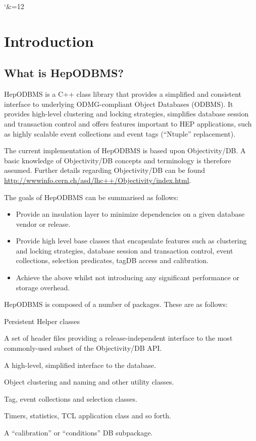 
\catcode`\&=12
\chapter{Introduction\label{H1Introduction}}
\section{What is HepODBMS?}
%

\par

HepODBMS is a C++ class library that provides a simplified and consistent
interface to underlying ODMG-compliant Object Databases (ODBMS).
It provides high-level clustering and locking strategies, simplifies database
session and transaction control and offers features important to HEP applications,
such as highly scalable event collections and event tags (``Ntuple'' replacement).

\par

The current implementation of HepODBMS is based upon Objectivity/DB. A basic
knowledge of Objectivity/DB concepts and terminology is therefore
assumed. Further details regarding Objectivity/DB can be found
\url{http://wwwinfo.cern.ch/asd/lhc++/Objectivity/index.html}.

\par

The goals of HepODBMS can be summarised as follows:

\begin{itemize}

\item Provide an insulation layer to minimize dependencies on a given
database vendor or release.
\item Provide high level base classes that encapsulate features such
as clustering and locking strategies, database session and transaction
control, event collections, selection predicates, tagDB access and
calibration.
\item Achieve the above whilst not introducing any significant
performance or storage overhead.\end{itemize}

\par

HepODBMS is composed of a number of packages. These are as follows:
\begin{DLtt}{Persistent Helper classes}
\item[Insulation Layer]A set of header files providing a release-independent interface
to the most commonly-used subset of the Objectivity/DB API.
\item[Transient Helper classes]A high-level, simplified interface to the database.
\item[Persistent Helper classes]Object clustering and naming and other utility classes.
\item[Tags and Collections]Tag, event collections and selection classes.
\item[Miscellaneous]Timers, statistics, TCL application class and so forth.
\item[Conditions DB]A ``calibration'' or ``conditions'' DB subpackage.
\end{DLtt}

